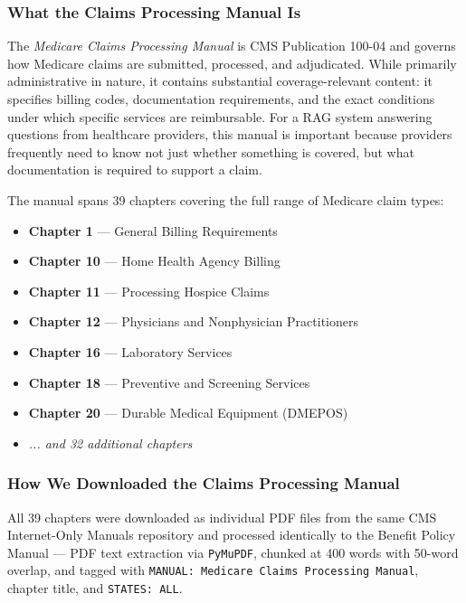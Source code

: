 \documentclass[12pt, letterpaper]{article}
\begin{document}
\subsubsection{What the Claims Processing Manual Is}

The \textit{Medicare Claims Processing Manual} is CMS Publication 100-04 and governs
how Medicare claims are submitted, processed, and adjudicated. While primarily
administrative in nature, it contains substantial coverage-relevant content: it
specifies billing codes, documentation requirements, and the exact conditions under
which specific services are reimbursable. For a RAG system answering questions from
healthcare providers, this manual is important because providers frequently need to
know not just whether something is covered, but what documentation is required to
support a claim.

The manual spans 39 chapters covering the full range of Medicare claim types:

\begin{itemize}[noitemsep, topsep=4pt]
    \item \textbf{Chapter 1} --- General Billing Requirements
    \item \textbf{Chapter 10} --- Home Health Agency Billing
    \item \textbf{Chapter 11} --- Processing Hospice Claims
    \item \textbf{Chapter 12} --- Physicians and Nonphysician Practitioners
    \item \textbf{Chapter 16} --- Laboratory Services
    \item \textbf{Chapter 18} --- Preventive and Screening Services
    \item \textbf{Chapter 20} --- Durable Medical Equipment (DMEPOS)
    \item \textit{... and 32 additional chapters}
\end{itemize}

\subsubsection{How We Downloaded the Claims Processing Manual}

All 39 chapters were downloaded as individual PDF files from the same CMS Internet-Only
Manuals repository and processed identically to the Benefit Policy Manual --- PDF text
extraction via \texttt{PyMuPDF}, chunked at 400 words with 50-word overlap, and tagged
with \texttt{MANUAL: Medicare Claims Processing Manual}, chapter title, and
\texttt{STATES: ALL}.
\end{document}
